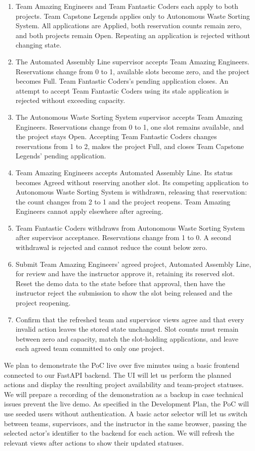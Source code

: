 \documentclass{article}
\begin{document}
\begin{enumerate}
    \item Team Amazing Engineers and Team Fantastic Coders each apply to both projects. Team Capstone Legends applies only to Autonomous Waste Sorting System. All applications are Applied, both reservation counts remain zero, and both projects remain Open. Repeating an application is rejected without changing state.
    \item The Automated Assembly Line supervisor accepts Team Amazing Engineers. Reservations change from 0 to 1, available slots become zero, and the project becomes Full. Team Fantastic Coders's pending application closes. An attempt to accept Team Fantastic Coders using its stale application is rejected without exceeding capacity.
    \item The Autonomous Waste Sorting System supervisor accepts Team Amazing Engineers. Reservations change from 0 to 1, one slot remains available, and the project stays Open. Accepting Team Fantastic Coders changes reservations from 1 to 2, makes the project Full, and closes Team Capstone Legends' pending application.
    \item Team Amazing Engineers accepts Automated Assembly Line. Its status becomes Agreed without reserving another slot. Its competing application to Autonomous Waste Sorting System is withdrawn, releasing that reservation: the count changes from 2 to 1 and the project reopens. Team Amazing Engineers cannot apply elsewhere after agreeing.
    \item Team Fantastic Coders withdraws from Autonomous Waste Sorting System after supervisor acceptance. Reservations change from 1 to 0. A second withdrawal is rejected and cannot reduce the count below zero.
    \item Submit Team Amazing Engineers' agreed project, Automated Assembly Line, for review and have the instructor approve it, retaining its reserved slot. Reset the demo data to the state before that approval, then have the instructor reject the submission to show the slot being released and the project reopening.
    \item Confirm that the refreshed team and supervisor views agree and that every invalid action leaves the stored state unchanged. Slot counts must remain between zero and capacity, match the slot-holding applications, and leave each agreed team committed to only one project.
\end{enumerate}

We plan to demonstrate the PoC live over five minutes using a basic frontend connected to our FastAPI backend. The UI will let us perform the planned actions and display the resulting project availability and team-project statuses. We will prepare a recording of the demonstration as a backup in case technical issues prevent the live demo. As specified in the Development Plan, the PoC will use seeded users without authentication. A basic actor selector will let us switch between teams, supervisors, and the instructor in the same browser, passing the selected actor's identifier to the backend for each action. We will refresh the relevant views after actions to show their updated statuses.
\end{document}
